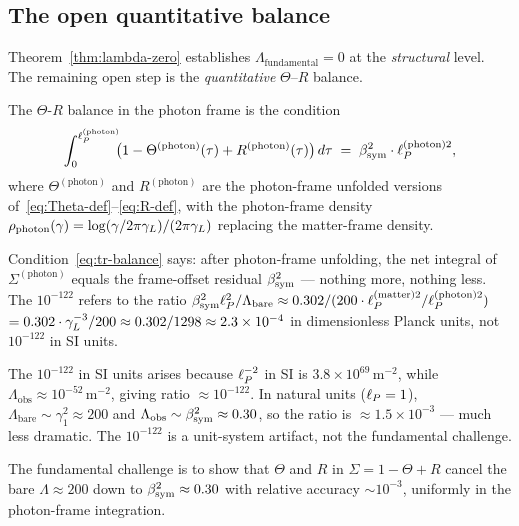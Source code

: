 \subsection{The open quantitative balance}
\label{ssec:open-balance}

Theorem~\ref{thm:lambda-zero} establishes $\Lambda_{\mathrm{fundamental}}=0$
at the \emph{structural} level. The remaining open step is the
\emph{quantitative} $\Theta$--$R$ balance.

\begin{definition}
\label{def:tr-balance}
The $\Theta$-$R$ balance in the photon frame is the condition
\begin{equation}\label{eq:tr-balance}
  \int_0^{\ell_P^{(\mathrm{photon})}} \!\!
  \bigl(1 - \Theta^{(\mathrm{photon})}(\tau) + R^{(\mathrm{photon})}(\tau)\bigr)
  \,d\tau \;=\; \beta_{\mathrm{sym}}^2 \cdot \ell_P^{(\mathrm{photon})2},
\end{equation}
where $\Theta^{(\mathrm{photon})}$ and $R^{(\mathrm{photon})}$ are the
photon-frame unfolded versions of~\eqref{eq:Theta-def}--\eqref{eq:R-def},
with the photon-frame density $\rho_{\mathrm{photon}}(\gamma) =
\log(\gamma/2\pi\gamma_L)/(2\pi\gamma_L)$ replacing the matter-frame density.
\end{definition}

\begin{remark}
\label{rem:open}
Condition~\eqref{eq:tr-balance} says: after photon-frame unfolding,
the net integral of $\Sigma^{(\mathrm{photon})}$ equals the frame-offset
residual $\beta_{\mathrm{sym}}^2$ — nothing more, nothing less. The $10^{-122}$ refers
to the ratio $\beta_{\mathrm{sym}}^2\ell_P^{2}/\Lambda_{\mathrm{bare}} \approx 0.302 /
(200\cdot\ell_P^{(\mathrm{matter})2}/\ell_P^{(\mathrm{photon})2})$
$= 0.302 \cdot \gamma_L^{-3} / 200 \approx 0.302/1298 \approx 2.3\times
10^{-4}$ in dimensionless Planck units, not $10^{-122}$ in SI units.

\medskip
\noindent The $10^{-122}$ in SI units arises because $\ell_P^{-2}$ in SI is
$3.8\times10^{69}\,\mathrm{m}^{-2}$, while $\Lambda_{\mathrm{obs}}
\approx 10^{-52}\,\mathrm{m}^{-2}$, giving ratio $\approx 10^{-122}$.
In natural units ($\ell_P=1$), $\Lambda_{\mathrm{bare}} \sim \gamma_1^2
\approx 200$ and $\Lambda_{\mathrm{obs}} \sim \beta_{\mathrm{sym}}^2 \approx 0.30$,
so the ratio is $\approx 1.5\times 10^{-3}$ — much less dramatic. The
$10^{-122}$ is a unit-system artifact, not the fundamental challenge.

\medskip
\noindent The fundamental challenge is to show that $\Theta$ and $R$ in
$\Sigma = 1 - \Theta + R$ cancel the bare $\Lambda \approx 200$ down to
$\beta_{\mathrm{sym}}^2 \approx 0.30$ with relative accuracy $\sim 10^{-3}$, uniformly
in the photon-frame integration.
\end{remark}

